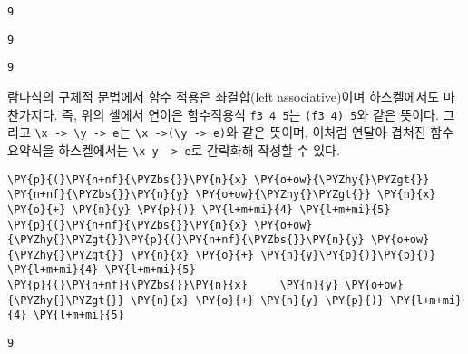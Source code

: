     
    \begin{Verbatim}[commandchars=\\\{\}]
9
    \end{Verbatim}

    
    
    \begin{Verbatim}[commandchars=\\\{\}]
9
    \end{Verbatim}

    
    
    \begin{Verbatim}[commandchars=\\\{\}]
9
    \end{Verbatim}

    
    \noindent 람다식의 구체적 문법에서 함수 적용은 좌결합(left
associative)이며 하스켈에서도 마찬가지다. 즉, 위의 셀에서 연이은
함수적용식 \texttt{f3\ 4\ 5}는 \texttt{(f3\ 4)\ 5}와 같은 뜻이다. 그리고
\texttt{\textbackslash{}x\ -\textgreater{}\ \textbackslash{}y\ -\textgreater{}\ e}는
\texttt{\textbackslash{}x\ -\textgreater{}(\textbackslash{}y\ -\textgreater{}\ e)}와
같은 뜻이며, 이처럼 연달아 겹쳐진 함수요약식을 하스켈에서는
\texttt{\textbackslash{}x\ y\ -\textgreater{}\ e}로 간략화해 작성할 수
있다.

    \begin{tcolorbox}[breakable, size=fbox, boxrule=1pt, pad at break*=1mm,colback=cellbackground, colframe=cellborder, top=.75ex]
\begin{Verbatim}[commandchars=\\\{\}]
\PY{p}{(}\PY{n+nf}{\PYZbs{}}\PY{n}{x} \PY{o+ow}{\PYZhy{}\PYZgt{}} \PY{n+nf}{\PYZbs{}}\PY{n}{y} \PY{o+ow}{\PYZhy{}\PYZgt{}} \PY{n}{x} \PY{o}{+} \PY{n}{y} \PY{p}{)} \PY{l+m+mi}{4} \PY{l+m+mi}{5}
\PY{p}{(}\PY{n+nf}{\PYZbs{}}\PY{n}{x} \PY{o+ow}{\PYZhy{}\PYZgt{}}\PY{p}{(}\PY{n+nf}{\PYZbs{}}\PY{n}{y} \PY{o+ow}{\PYZhy{}\PYZgt{}} \PY{n}{x} \PY{o}{+} \PY{n}{y}\PY{p}{)}\PY{p}{)} \PY{l+m+mi}{4} \PY{l+m+mi}{5}
\PY{p}{(}\PY{n+nf}{\PYZbs{}}\PY{n}{x}     \PY{n}{y} \PY{o+ow}{\PYZhy{}\PYZgt{}} \PY{n}{x} \PY{o}{+} \PY{n}{y} \PY{p}{)} \PY{l+m+mi}{4} \PY{l+m+mi}{5}
\end{Verbatim}
\end{tcolorbox}

    
    \begin{Verbatim}[commandchars=\\\{\}]
9
    \end{Verbatim}

    
    
